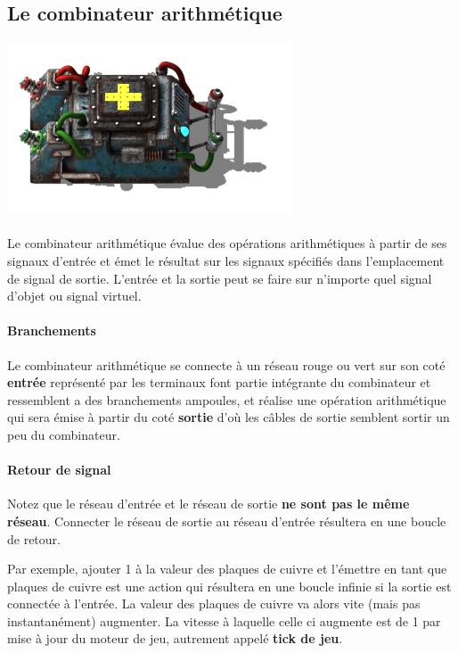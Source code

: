 \subsection{Le combinateur arithmétique}

\begin{minipage}[t]{\textwidth}

{
\centering
\includegraphics{pics/factorio-arithmetic.png}
}


\end{minipage} 


\paragraph{}
Le combinateur arithmétique évalue des opérations arithmétiques à partir de ses signaux d'entrée et émet le résultat sur les signaux spécifiés dans l'emplacement de signal de sortie. 
L'entrée et la sortie peut se faire sur n'importe quel signal d'objet ou signal virtuel.

\paragraph{Branchements} 
Le combinateur arithmétique se connecte à un réseau rouge ou vert sur son coté \textbf{entrée} représenté par les terminaux font partie intégrante du combinateur et ressemblent a des branchements ampoules, et réalise une opération arithmétique qui sera émise à partir du coté \textbf{sortie} d'où les câbles de sortie semblent sortir un peu du combinateur. 

\paragraph{Retour de signal}
Notez que le réseau d'entrée et le réseau de sortie \textbf{ne sont pas le même réseau}.
Connecter le réseau de sortie au réseau d'entrée résultera en une boucle de retour. 

Par exemple, ajouter 1 à la valeur des plaques de cuivre et l'émettre en tant que plaques de cuivre est une action qui résultera en une boucle infinie si la sortie est connectée à l'entrée. 
La valeur des plaques de cuivre va alors vite (mais pas instantanément) augmenter. 
La vitesse à laquelle celle ci augmente est de 1 par mise à jour du moteur de jeu, autrement appelé \textbf{tick de jeu}. 

